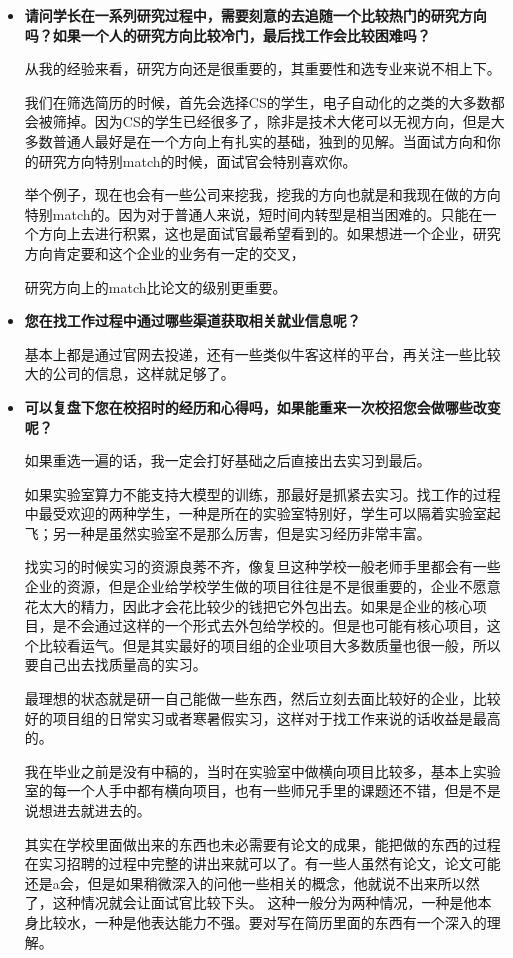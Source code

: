 \begin{itemize}
    \item \textbf{请问学长在一系列研究过程中，需要刻意的去追随一个比较热门的研究方向吗？如果一个人的研究方向比较冷门，最后找工作会比较困难吗？}

    从我的经验来看，研究方向还是很重要的，其重要性和选专业来说不相上下。
    
我们在筛选简历的时候，首先会选择CS的学生，电子自动化的之类的大多数都会被筛掉。因为CS的学生已经很多了，除非是技术大佬可以无视方向，但是大多数普通人最好是在一个方向上有扎实的基础，独到的见解。当面试方向和你的研究方向特别match的时候，面试官会特别喜欢你。

举个例子，现在也会有一些公司来挖我，挖我的方向也就是和我现在做的方向特别match的。因为对于普通人来说，短时间内转型是相当困难的。只能在一个方向上去进行积累，这也是面试官最希望看到的。如果想进一个企业，研究方向肯定要和这个企业的业务有一定的交叉，

研究方向上的match比论文的级别更重要。

    \item \textbf{您在找工作过程中通过哪些渠道获取相关就业信息呢？}

基本上都是通过官网去投递，还有一些类似牛客这样的平台，再关注一些比较大的公司的信息，这样就足够了。

    \item \textbf{可以复盘下您在校招时的经历和心得吗，如果能重来一次校招您会做哪些改变呢？}

如果重选一遍的话，我一定会打好基础之后直接出去实习到最后。

如果实验室算力不能支持大模型的训练，那最好是抓紧去实习。找工作的过程中最受欢迎的两种学生，一种是所在的实验室特别好，学生可以隔着实验室起飞；另一种是虽然实验室不是那么厉害，但是实习经历非常丰富。

找实习的时候实习的资源良莠不齐，像复旦这种学校一般老师手里都会有一些企业的资源，但是企业给学校学生做的项目往往是不是很重要的，企业不愿意花太大的精力，因此才会花比较少的钱把它外包出去。如果是企业的核心项目，是不会通过这样的一个形式去外包给学校的。但是也可能有核心项目，这个比较看运气。但是其实最好的项目组的企业项目大多数质量也很一般，所以要自己出去找质量高的实习。

最理想的状态就是研一自己能做一些东西，然后立刻去面比较好的企业，比较好的项目组的日常实习或者寒暑假实习，这样对于找工作来说的话收益是最高的。

我在毕业之前是没有中稿的，当时在实验室中做横向项目比较多，基本上实验室的每一个人手中都有横向项目，也有一些师兄手里的课题还不错，但是不是说想进去就进去的。

其实在学校里面做出来的东西也未必需要有论文的成果，能把做的东西的过程在实习招聘的过程中完整的讲出来就可以了。有一些人虽然有论文，论文可能还是a会，但是如果稍微深入的问他一些相关的概念，他就说不出来所以然了，这种情况就会让面试官比较下头。
这种一般分为两种情况，一种是他本身比较水，一种是他表达能力不强。要对写在简历里面的东西有一个深入的理解。


\end{itemize}
